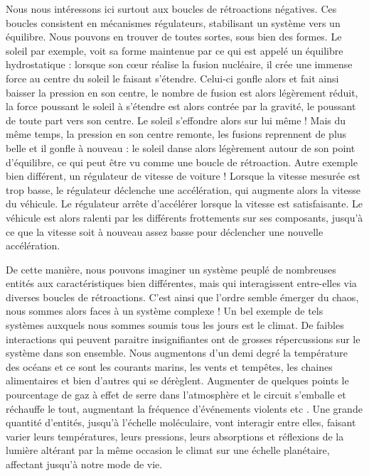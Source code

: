 			Nous nous intéressons ici surtout aux boucles de rétroactions négatives. Ces boucles consistent en mécanismes régulateurs, stabilisant un système vers un équilibre. Nous pouvons en trouver de toutes sortes, sous bien des formes. Le soleil par exemple, voit sa forme maintenue par ce qui est appelé un équilibre hydrostatique : lorsque son cœur réalise la fusion nucléaire, il crée une immense force au centre du soleil le faisant s'étendre. Celui-ci gonfle alors et fait ainsi baisser la pression en son centre, le nombre de fusion est alors légèrement réduit, la force poussant le soleil à s'étendre est alors contrée par la gravité, le poussant de toute part vers son centre. Le soleil s'effondre alors sur lui même ! Mais du même temps, la pression en son centre remonte, les fusions reprennent de plus belle et il gonfle à nouveau : le soleil danse alors légèrement autour de son point d'équilibre, ce qui peut être vu comme une boucle de rétroaction. Autre exemple bien différent, un régulateur de vitesse de voiture ! Lorsque la vitesse mesurée est trop basse, le régulateur déclenche une accélération, qui augmente alors la vitesse du véhicule. Le régulateur arrête d'accélérer lorsque la vitesse est satisfaisante. Le véhicule est alors ralenti par les différents frottements sur ses composants, jusqu'à ce que la vitesse soit à nouveau assez basse pour déclencher une nouvelle accélération.
			
			De cette manière, nous pouvons imaginer un système peuplé de nombreuses entités aux caractéristiques bien différentes, mais qui interagissent entre-elles via diverses boucles de rétroactions. C'est ainsi que l'ordre semble émerger du chaos, nous sommes alors faces à un système complexe ! Un bel exemple de tels systèmes auxquels nous sommes soumis tous les jours est le climat. De faibles interactions qui peuvent paraitre insignifiantes ont de grosses répercussions sur le système dans son ensemble. Nous augmentons d'un demi degré la température des océans et ce sont les courants marins, les vents et tempêtes, les chaines alimentaires et bien d'autres qui se dérèglent. Augmenter de quelques points le pourcentage de gaz à effet de serre dans l'atmosphère et le circuit s'emballe et réchauffe le tout, augmentant la fréquence d'événements violents etc \cite{allen_2018_2018}. Une grande quantité d'entités, jusqu'à l'échelle moléculaire, vont interagir entre elles, faisant varier leurs températures, leurs pressions, leurs absorptions et réflexions de la lumière altérant par la même occasion le climat sur une échelle planétaire, affectant jusqu'à notre mode de vie. 
						
